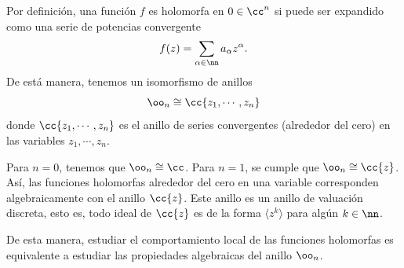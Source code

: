 \begin{remark}
	Por definición, una función $f$ es holomorfa en $0\in\cc^n$ si puede ser expandido como una serie de potencias convergente 
	\begin{equation*}
		f(z)=\sum_{\alpha\in\nn}a_\alpha z^\alpha.
	\end{equation*}
	De está manera, tenemos un isomorfismo de anillos 
	\begin{equation*}
		\oo_{n}\cong \cc\{z_1,\cdots,z_n\}
	\end{equation*}
	donde $\cc\{z_1,\cdots,z_n\}$ es el anillo de series convergentes (alrededor del cero) en las variables $z_1,\cdots,z_n$.
\end{remark}

\begin{example}
	Para $n=0$, tenemos que $\oo_{n}\cong\cc$. Para $n=1$, se cumple que $\oo_{n}\cong\cc\{z\}$. Así, las funciones holomorfas alrededor del cero en una variable corresponden algebraicamente con el anillo $\cc\{z\}$. Este anillo es un anillo de valuación discreta, esto es, todo ideal de $\cc\{z\}$ es de la forma $\langle z^k \rangle$ para algún $k\in\nn$.
\end{example}

De esta manera, estudiar el comportamiento local de las funciones holomorfas es equivalente a estudiar las propiedades algebraicas del anillo $\oo_{n}$.


